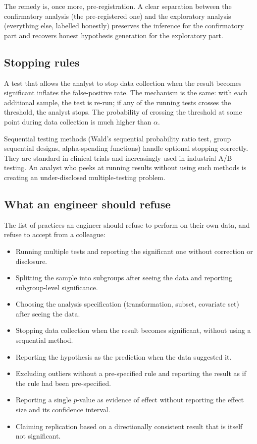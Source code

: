 The remedy is, once more, pre-registration. A clear separation
between the confirmatory analysis (the pre-registered one) and the
exploratory analysis (everything else, labelled honestly) preserves
the inference for the confirmatory part and recovers honest
hypothesis generation for the exploratory part.

\subsection{Stopping rules}

A test that allows the analyst to stop data collection when the
result becomes significant inflates the false-positive rate. The
mechanism is the same: with each additional sample, the test is
re-run; if any of the running tests crosses the threshold, the
analyst stops. The probability of crossing the threshold at some
point during data collection is much higher than $\alpha$.

Sequential testing methods (Wald's sequential probability ratio
test, group sequential designs, alpha-spending functions) handle
optional stopping correctly. They are standard in clinical trials
and increasingly used in industrial A/B testing. An analyst who
peeks at running results without using such methods is creating an
under-disclosed multiple-testing problem.

\subsection{What an engineer should refuse}

The list of practices an engineer should refuse to perform on their
own data, and refuse to accept from a colleague:

\begin{itemize}[leftmargin=*]
  \item Running multiple tests and reporting the significant one
    without correction or disclosure.
  \item Splitting the sample into subgroups after seeing the data
    and reporting subgroup-level significance.
  \item Choosing the analysis specification (transformation, subset,
    covariate set) after seeing the data.
  \item Stopping data collection when the result becomes
    significant, without using a sequential method.
  \item Reporting the hypothesis as the prediction when the data
    suggested it.
  \item Excluding outliers without a pre-specified rule and reporting
    the result as if the rule had been pre-specified.
  \item Reporting a single $p$-value as evidence of effect without
    reporting the effect size and its confidence interval.
  \item Claiming replication based on a directionally consistent
    result that is itself not significant.
\end{itemize}

